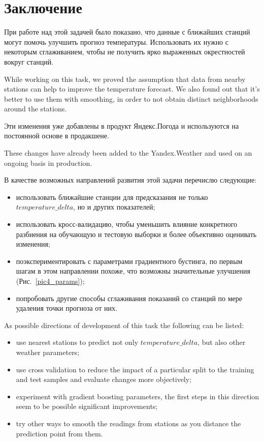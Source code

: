 \documentclass[14pt]{matmex-diploma}
\begin{document}
\section*{Заключение}
При работе над этой задачей было показано, что данные с ближайших станций могут помочь улучшить прогноз температуры.  Использовать их нужно с некоторым сглаживанием, чтобы не получить ярко выраженных окрестностей вокруг станций.

While working on this task, we proved the assumption that data from nearby stations can help to improve the temperature forecast.  We also found out that it's better to use them with smoothing, in order to not obtain distinct neighborhoods around the stations.

Эти изменения уже добавлены в продукт Яндекс.Погода и используются на постоянной основе в продакшене.

These changes have already been added to the Yandex.Weather and used on an ongoing basis in production.


В качестве возможных направлений развития этой задачи перечислю следующие:
\begin{itemize}
    \item использовать ближайшие станции для предсказания не только $temperature\_delta$, но и других показателей;
    \item использовать кросс-валидацию, чтобы уменьшить влияние конкретного разбиения на обучающую и тестовую выборки и более объективно оценивать изменения;
    \item поэкспериментировать с параметрами градиентного бустинга, по первым шагам в этом направлении похоже, что возможны значительные улучшения (Рис.~\ref{pic4_params});
    \item попробовать другие способы сглаживания показаний со станций по мере удаления точки прогноза от них. 
\end{itemize}


As possible directions of development of this task the following can be listed:
\begin{itemize}
    \item use nearest stations to predict not only $temperature\_delta$, but also other weather parameters;
    \item use cross validation to reduce the impact of a particular split to the training and test samples and evaluate changes more objectively;
    \item experiment with gradient boosting parameters, the first steps in this direction seem to be possible significant improvements;
    \item try other ways to smooth the readings from stations as you distance the prediction point from them. 
\end{itemize}
\end{document}
